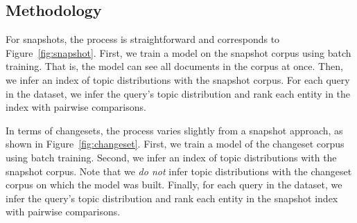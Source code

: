 
\subsection{Methodology}
\label{sec:methodology}

For snapshots, the process is straightforward and corresponds to
Figure~\ref{fig:snapshot}.  First, we train a model on the snapshot corpus using
batch training.  That is, the model can see all documents in the corpus at once.
Then, we infer an index of topic distributions with the snapshot corpus.  For
each query in the dataset, we infer the query's topic distribution and rank each
entity in the index with pairwise comparisons.

In terms of changesets, the process varies slightly from a snapshot approach, as
shown in Figure~\ref{fig:changeset}.  First, we train a model of the changeset
corpus using batch training.  Second, we infer an index of topic distributions
with the snapshot corpus.  Note that we \emph{do not} infer topic distributions
with the changeset corpus on which the model was built.  Finally, for each query
in the dataset, we infer the query's topic distribution and rank each entity in
the snapshot index with pairwise comparisons.


